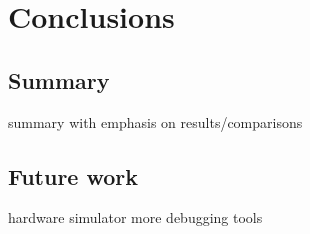\section{Conclusions}
\subsection{Summary}
summary with emphasis on results/comparisons
\subsection{Future work}
hardware simulator
more debugging tools
